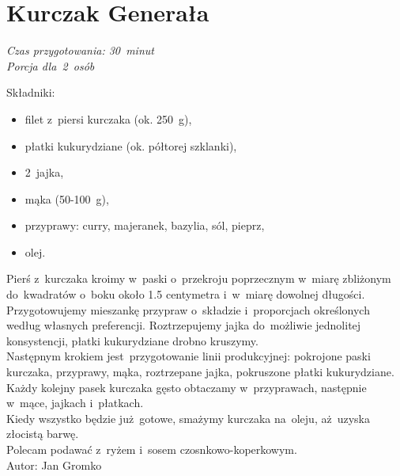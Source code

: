 \newpage
\section{Kurczak Generała}
\vspace*{8pt}


\textit{Czas przygotowania: 30~minut}\\
\textit{Porcja dla~2~osób}\\

\vspace{2pt}

Składniki:
\begin{itemize}
	\item filet z~piersi kurczaka (ok. 250~g),
	\item płatki kukurydziane (ok. półtorej szklanki),
	\item 2~jajka,
	\item mąka (50-100~g),
	\item przyprawy: curry, majeranek, bazylia, sól, pieprz,
	\item olej.
\end{itemize}

Pierś z~kurczaka kroimy w~paski o~przekroju poprzecznym w~miarę zbliżonym do~kwadratów o~boku około 1.5 centymetra i~w~miarę dowolnej długości.\\

Przygotowujemy mieszankę przypraw o~składzie i~proporcjach określonych według własnych preferencji. Roztrzepujemy jajka do~możliwie jednolitej konsystencji, płatki kukurydziane drobno kruszymy.\\

Następnym krokiem jest~przygotowanie linii produkcyjnej: pokrojone paski kurczaka, przyprawy, mąka, roztrzepane jajka, pokruszone płatki kukurydziane.
Każdy kolejny pasek kurczaka gęsto obtaczamy w~przyprawach, następnie w~mące, jajkach i~płatkach.\\

Kiedy wszystko będzie już~gotowe, smażymy kurczaka na~oleju, aż~uzyska złocistą barwę.\\

Polecam podawać z~ryżem i~sosem czosnkowo-koperkowym.\\

Autor: Jan Gromko


